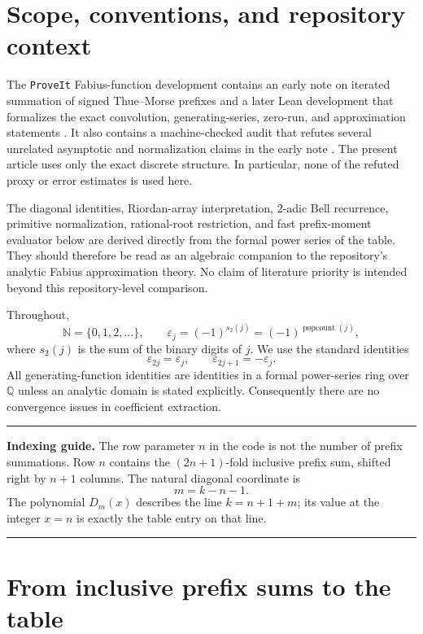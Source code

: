 \documentclass[11pt,oneside]{article}
\theoremstyle{definition}
\theoremstyle{remark}
\newcommand{\N}{\mathbb N}
\newcommand{\Q}{\mathbb Q}
\newcommand{\eps}{\varepsilon}
\newcommand{\Diag}{D}
\newcommand{\bitsum}{s_{2}}
\DeclareMathOperator{\popcount}{popcount}
\newenvironment{resultbox}{%
  \par\smallskip\noindent\begin{center}\begin{minipage}{0.94\textwidth}%
  \color{black}\hrule\vspace{0.65em}\small
}{%
  \vspace{0.65em}\hrule\end{minipage}\end{center}\smallskip
}
\begin{document}
\tableofcontents
\newpage

\section{Scope, conventions, and repository context}
\label{sec:scope}

The \texttt{ProveIt} Fabius-function development contains an early note on
iterated summation of signed Thue--Morse prefixes and a later Lean development
that formalizes the exact convolution, generating-series, zero-run, and
approximation statements \cite{proveit-early,proveit-prefix,proveit-approx}.
It also contains a machine-checked audit that refutes several unrelated
asymptotic and normalization claims in the early note
\cite{proveit-audit}.  The present article uses only the exact discrete
structure.  In particular, none of the refuted proxy or error estimates is
used here.

The diagonal identities, Riordan-array interpretation, $2$-adic Bell
recurrence, primitive normalization, rational-root restriction, and fast
prefix-moment evaluator below are derived directly from the formal power
series of the table.  They should therefore be read as an algebraic companion
to the repository's analytic Fabius approximation theory.  No claim of
literature priority is intended beyond this repository-level comparison.

Throughout,
\[
 \N=\{0,1,2,\ldots\},\qquad
 \eps_j=(-1)^{\bitsum(j)}=(-1)^{\popcount(j)},
\]
where $\bitsum(j)$ is the sum of the binary digits of $j$.  We use the
standard identities
\begin{equation}
 \eps_{2j}=\eps_j,
 \qquad
 \eps_{2j+1}=-\eps_j.
 \label{eq:tm-doubling}
\end{equation}
All generating-function identities are identities in a formal power-series
ring over $\Q$ unless an analytic domain is stated explicitly.  Consequently
there are no convergence issues in coefficient extraction.

\begin{resultbox}
\textbf{Indexing guide.}
The row parameter $n$ in the code is not the number of prefix summations.
Row $n$ contains the $(2n+1)$-fold inclusive prefix sum, shifted right by
$n+1$ columns.  The natural diagonal coordinate is
\[
 m=k-n-1.
\]
The polynomial $\Diag_m(x)$ describes the line $k=n+1+m$; its value at the
integer $x=n$ is exactly the table entry on that line.
\end{resultbox}

\section{From inclusive prefix sums to the table}
\label{sec:prefix}
\end{document}
